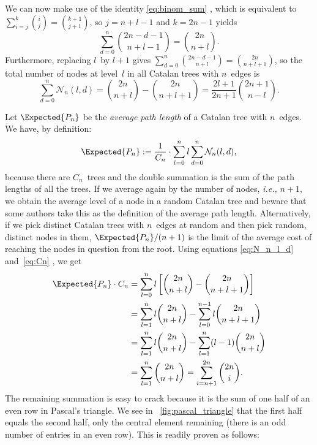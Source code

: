 We can now make use of the identity \eqref{eq:binom_sum}
, which is equivalent to
\(\sum_{i=j}^{k}\binom{i}{j} = \binom{k+1}{j+1}\), so
\(j=n+l-1\) and \(k=2n-1\) yields
\begin{equation*}
\sum_{d=0}^{n}\binom{2n-d-1}{n+l-1} = \binom{2n}{n+l}.
\end{equation*}
Furthermore, replacing \(l\)~by \(l+1\) gives
\(\sum_{d=0}^{n}\binom{2n-d-1}{n+l} = \binom{2n}{n+l+1}\), so the
total number of nodes at level~\(l\) in all Catalan trees with
\(n\)~edges is
\begin{equation}
\sum_{d=0}^{n}\mathcal{N}_n(l,d)
 = \binom{2n}{n+l} - \binom{2n}{n+l+1}
 = \frac{2l+1}{2n+1}\binom{2n+1}{n-l}.
\label{eq:N_n_l_d}
\end{equation}

Let \(\Expected{P_n}\) be the \emph{average path length} of a Catalan
tree with \(n\)~edges. We have, by definition:
\begin{equation*}
  \Expected{P_n} := \frac{1}{C_{n}} \cdot \sum_{l=0}^{n}l\sum_{d=0}^{n}\mathcal{N}_n(l,d),
\end{equation*}
because there are \(C_n\)~trees and the double summation is the sum of
the path lengths of all the trees. If we average again by the number
of nodes, \emph{i.e.,} \(n+1\), we obtain the average level of a node
in a random Catalan tree and beware that some authors take this as the
definition of the average path length. Alternatively, if we pick
distinct Catalan trees with \(n\)~edges at random and then pick
random, distinct nodes in them, \(\Expected{P_n}/(n+1)\) is the limit
of the average cost of reaching the nodes in question from the
root. Using equations \eqref{eq:N_n_l_d} and~\eqref{eq:Cn}
, we get
\begin{align*}
\Expected{P_n} \cdot C_n
 &= \sum_{l=0}^{n}l\left[\binom{2n}{n+l} - \binom{2n}{n+l+1}\right]\\
 &= \sum_{l=1}^{n}l \binom{2n}{n+l} - \sum_{l=0}^{n-1}l \binom{2n}{n+l+1}\\
 &= \sum_{l=1}^{n}l \binom{2n}{n+l} - \sum_{l=1}^{n}(l-1)\binom{2n}{n+l}\\
 &= \sum_{l=1}^{n}\binom{2n}{n+l}
  = \sum_{i=n+1}^{2n}\binom{2n}{i}.
\end{align*}
The remaining summation is easy to crack because it is the sum of one
half of an even row in Pascal's triangle. We see in
\fig~\vref{fig:pascal_triangle} that the first half equals the second
half, only the central element remaining (there is an odd number of
entries in an even row). This is readily proven as follows:
